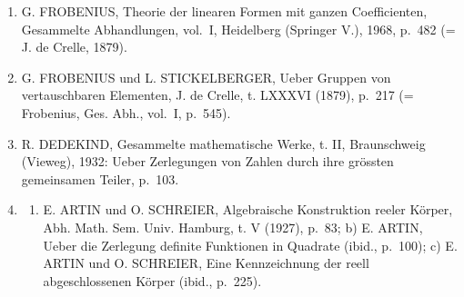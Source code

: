 \begin{enumerate}
  C. JORDAN, Traité des substitutions et des équations algébriques. Paris (Gauthier-Villars), 1870, p.~114-125.
\item
  G. FROBENIUS, Theorie der linearen Formen mit ganzen Coefficienten, Gesammelte Abhandlungen, vol.~I, Heidelberg (Springer V.), 1968, p.~482 (= J. de Crelle, 1879).
\item
  G. FROBENIUS und L. STICKELBERGER, Ueber Gruppen von vertauschbaren Elementen, J. de Crelle, t. LXXXVI (1879), p.~217 (= Frobenius, Ges. Abh., vol.~I, p.~545).
\item
  R. DEDEKIND, Gesammelte mathematische Werke, t. II, Braunschweig (Vieweg), 1932: Ueber Zerlegungen von Zahlen durch ihre grössten gemeinsamen Teiler, p.~103.
\item
  \begin{enumerate}
  \def\labelenumii{\alph{enumii})}
  \tightlist
  \item
    E. ARTIN und O. SCHREIER, Algebraische Konstruktion reeler Körper, Abh. Math. Sem. Univ. Hamburg, t. V (1927), p.~83; b) E. ARTIN, Ueber die Zerlegung definite Funktionen in Quadrate (ibid., p.~100); c) E. ARTIN und O. SCHREIER, Eine Kennzeichnung der reell abgeschlossenen Körper (ibid., p.~225).
  \end{enumerate}
\end{enumerate}

